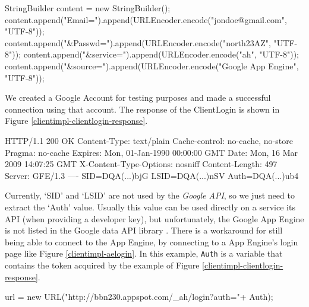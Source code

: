 \begin{figure*}[ht] %
\begin{center}
\begin{code}
StringBuilder content = new StringBuilder();
content.append("Email=").append(URLEncoder.encode("jondoe@gmail.com", 
  "UTF-8"));
content.append("&Passwd=").append(URLEncoder.encode("north23AZ", "UTF-8"));
content.append("&service=").append(URLEncoder.encode("ah", "UTF-8"));
content.append("&source=").append(URLEncoder.encode("Google App Engine", 
  "UTF-8"));
\end{code}
\caption{Preparing our ClientLogin credentials.\label{clientimpl-clientlogin}}
\end{center}
\end{figure*}

We created a Google Account for testing purposes and made a successful connection
using that account. The response of the ClientLogin is shown in Figure
\ref{clientimpl-clientlogin-response}.

\begin{figure*}[ht] %
\begin{center}
\begin{code}
HTTP/1.1 200 OK
Content-Type: text/plain
Cache-control: no-cache, no-store
Pragma: no-cache
Expires: Mon, 01-Jan-1990 00:00:00 GMT
Date: Mon, 16 Mar 2009 14:07:25 GMT
X-Content-Type-Options: nosniff
Content-Length: 497
Server: GFE/1.3
----
SID=DQA(...)bjG
LSID=DQA(...)nSV
Auth=DQA(...)ub4
\end{code}
\caption{A response from ClientLogin.\label{clientimpl-clientlogin-response}}
\end{center}
\end{figure*}

Currently, `SID' and `LSID' are not used by the \emph{Google API}, so we just
need to extract the `Auth' value. Usually this value can be used directly on a
service its API (when providing a developer key), but unfortunately, the Google
App Engine is not listed in the Google data API library \cite{service-api}.
There is a workaround for still being able to connect to the App Engine, by
connecting to a App Engine's login page like Figure \ref{clientimpl-aelogin}.
In this example, \texttt{Auth} is a variable that contains the token acquired
by the example of Figure \ref{clientimpl-clientlogin-response}. 

\begin{figure*}[ht] %
\begin{center}
\begin{code}
url = new URL("http://bbn230.appspot.com/_ah/login?auth="+ Auth);
\end{code}
\caption{Logging In for a Session Cookie.\label{clientimpl-aelogin}}
\end{center}
\end{figure*}


